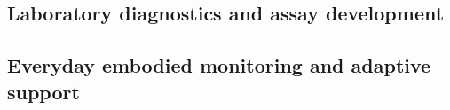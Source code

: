 \subsection{Laboratory diagnostics and assay development}
\label{subsec:laboratory_diagnostics}





\subsection{Everyday embodied monitoring and adaptive support}
\label{subsec:everyday_monitoring}



